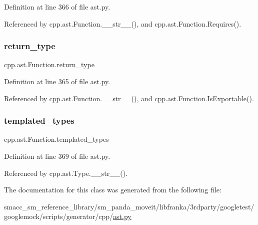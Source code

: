 Definition at line 366 of file ast.\+py.



Referenced by cpp.\+ast.\+Function.\+\_\+\+\_\+str\+\_\+\+\_\+(), and cpp.\+ast.\+Function.\+Requires().

\mbox{\label{classcpp_1_1ast_1_1Function_af750fd788d7ab33163ee066534780212}} 
\subsubsection{\texorpdfstring{return\+\_\+type}{return\_type}}
{\footnotesize\ttfamily cpp.\+ast.\+Function.\+return\+\_\+type}



Definition at line 365 of file ast.\+py.



Referenced by cpp.\+ast.\+Function.\+\_\+\+\_\+str\+\_\+\+\_\+(), and cpp.\+ast.\+Function.\+Is\+Exportable().

\mbox{\label{classcpp_1_1ast_1_1Function_a57bb03218bade3240137a0d91c467cb6}} 
\subsubsection{\texorpdfstring{templated\+\_\+types}{templated\_types}}
{\footnotesize\ttfamily cpp.\+ast.\+Function.\+templated\+\_\+types}



Definition at line 369 of file ast.\+py.



Referenced by cpp.\+ast.\+Type.\+\_\+\+\_\+str\+\_\+\+\_\+().



The documentation for this class was generated from the following file\+:\begin{DoxyCompactItemize}
\item 
smacc\+\_\+sm\+\_\+reference\+\_\+library/sm\+\_\+panda\+\_\+moveit/libfranka/3rdparty/googletest/googlemock/scripts/generator/cpp/\hyperlink{ast_8py}{ast.\+py}\end{DoxyCompactItemize}
